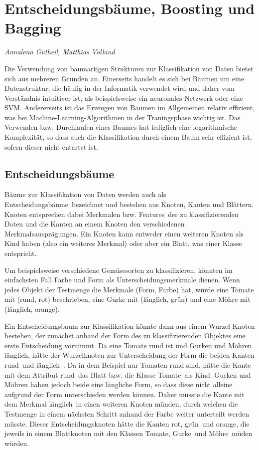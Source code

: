 \section{Entscheidungsbäume, Boosting und Bagging}
\textit{Annalena Gutheil, Matthias Volland}

Die Verwendung von baumartigen Strukturen zur Klassifikation von Daten bietet sich aus mehreren Gründen an. 
Einerseits handelt es sich bei Bäumen um eine Datenstruktur, die häufig in der Informatik verwendet wird und daher 
vom Verständnis intuitiver ist, als beispielsweise ein neuronales Netzwerk oder eine SVM. 
Andererseits ist das Erzeugen von Bäumen im Allgemeinen relativ effizient, was bei Machine-Learning-Algorithmen 
in der Traningsphase wichtig ist. Das Verwenden bzw. Durchlaufen eines Baumes hat lediglich eine logarithmische Komplexität, 
so dass auch die Klassifikation durch einem Baum sehr effizient ist, sofern dieser nicht entartet ist. 

\subsection*{Entscheidungsbäume}

Bäume zur Klassifikation von Daten werden auch als \glqq Entscheidungsbäume\grqq\ bezeichnet und bestehen aus Knoten, Kanten und Blättern. Knoten entsprechen dabei Merkmalen bzw. \glqq Features\grqq\ der zu klassifizierenden Daten und die Kanten an einem Knoten den verschiedenen Merkmalsausprägungen. 
Ein Knoten kann entweder einen weiteren Knoten als Kind haben (also ein weiteres Merkmal) oder aber ein Blatt, was einer Klasse entspricht.

Um beispielsweise verschiedene Gemüsesorten zu klassifizieren, könnten im einfachsten Fall Farbe und Form als Unterscheidungsmerkmale dienen. Wenn jedes Objekt der Testmenge die Merkmale (Form, Farbe) hat, würde eine Tomate mit (rund, rot) beschrieben, eine Gurke mit (länglich, grün) und eine Möhre mit (länglich, orange).

Ein Entscheidungsbaum zur Klassifikation könnte dann aus einem Wurzel-Knoten bestehen, der zunächst anhand der Form 
des zu klassifizierenden Objektes eine erste Entscheidung vornimmt. Da eine Tomate rund ist und Gurken und Möhren länglich, 
hätte der Wurzelknoten zur Unterscheidung der Form die beiden Kanten \glqq rund\grqq\ und \glqq länglich\grqq\ . Da in dem Beispiel nur Tomaten rund sind, hätte die Kante mit dem Attribut \glqq rund\grqq\ das Blatt bzw. die Klasse \glqq Tomate\grqq\ als Kind. Gurken und Möhren haben 
jedoch beide eine längliche Form, so dass diese nicht alleine aufgrund der Form unterschieden werden können. Daher müsste die 
Kante mit dem Merkmal \glqq länglich\grqq\ in einen weiteren Knoten münden, durch welchen die Testmenge in einem nächsten Schritt anhand der Farbe weiter unterteilt werden müsste. Dieser Entscheidungsknoten hätte die Kanten \glqq rot\grqq , \glqq grün\grqq\ und \glqq orange\grqq, die jeweils in einem Blattknoten mit den Klassen \glqq Tomate\grqq , \glqq Gurke\grqq\ und \glqq Möhre\grqq\ müden würden.

